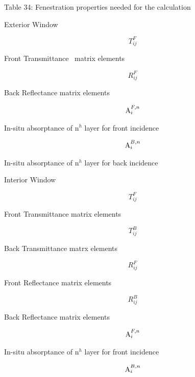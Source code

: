 Table 34: Fenestration properties needed for the calculation

Exterior Window

\begin{equation}
T_{ij}^F
\end{equation}

Front Transmittance~ matrix elements

\begin{equation}
R_{ij}^F
\end{equation}

Back Reflectance matrix elements

\begin{equation}
{\mathop{\rm A}\nolimits}_i^{F,n}
\end{equation}

In-situ absorptance of n\(^{h}\) layer for front incidence

\begin{equation}
{\mathop{\rm A}\nolimits}_i^{B,n}
\end{equation}

In-situ absorptance of n\(^{h}\) layer for back incidence

Interior Window

\begin{equation}
T_{ij}^F
\end{equation}

Front Transmittance matrix elements

\begin{equation}
T_{ij}^B
\end{equation}

Back Transmittance matrx elements

\begin{equation}
R_{ij}^F
\end{equation}

Front Reflectance matrix elements

\begin{equation}
R_{ij}^B
\end{equation}

Back Reflectance matrix elements

\begin{equation}
{\mathop{\rm A}\nolimits}_i^{F,n}
\end{equation}

In-situ absorptance of n\(^{h}\) layer for front incidence

\begin{equation}
{\mathop{\rm A}\nolimits}_i^{B,n}
\end{equation}

